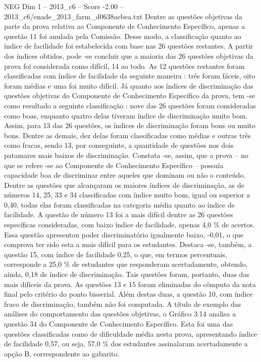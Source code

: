 \begin{textsample}{NEG Dim 1 – 2013\_c6 – Score -2.00 – 2013\_c6/enade\_2013\_farm\_d0638aebea.txt}
Dentre as questões objetivas da parte da prova relativa ao Componente de Conhecimento Específico, apenas a questão 11 foi anulada pela Comissão.
Desse modo, a classificação quanto ao índice de facilidade foi estabelecida com base nas 26 questões restantes.
A partir dos índices obtidos, pode -se concluir que a maioria das 26 questões objetivas da prova foi considerada como difícil, 14 ao todo.
As 12 questões restantes foram classificadas com índice de facilidade da seguinte maneira : três foram fáceis, oito foram médias e uma foi muito difícil.
Já quanto aos índices de discriminação das questões objetivas do Componente de Conhecimento Específico da prova, tem -se como resultado a seguinte classificação : nove das 26 questões foram consideradas como boas, enquanto quatro delas tiveram índice de discriminação muito bom.
Assim, para 13 das 26 questões, os índices de discriminação foram bons ou muito bons.
Dentre as demais, dez delas foram classificadas como médias e outras três como fracas, sendo 13, por conseguinte, a quantidade de questões nos dois patamares mais baixos de discriminação.
Constata -se, assim, que a prova – no que se refere -se ao Componente de Conhecimento Específico – possuía capacidade boa de discriminar entre aqueles que dominam ou não o conteúdo.
Dentre as questões que alcançaram os maiores índices de discriminação, as de números 14, 25, 33 e 34 classificadas com índice muito bom, igual ou superior a 0,40, todas elas foram classificadas na categoria média quanto ao índice de facilidade.
A questão de número 13 foi a mais difícil dentre as 26 questões específicas consideradas, com baixo índice de facilidade, apenas 4,0 \% de acertos.
Essa questão apresentou poder discriminatório igualmente baixo, -0,01, o que comprova ter sido esta a mais difícil para os estudantes.
Destaca -se, também, a questão 15, com índice de facilidade 0,25, o que, em termos percentuais, corresponde a 25,0 \% de estudantes que responderam acertadamente, obtendo, ainda, 0,18 de índice de discriminação.
Tais questões foram, portanto, duas das mais difíceis da prova.
As questões 13 e 15 foram eliminadas do cômputo da nota final pelo critério do ponto bisserial.
Além destas duas, a questão 10, com índice fraco de discriminação, também não foi computada.
A título de exemplo das análises do comportamento das questões objetivas, o Gráfico 3.14 analisa a questão 34 do Componente de Conhecimento Específico.
Esta foi uma das questões classificadas como de dificuldade média nesta prova, apresentando índice de facilidade 0,57, ou seja, 57,0 \% dos estudantes assinalaram acertadamente a opção B, correspondente ao gabarito.

\end{textsample}
